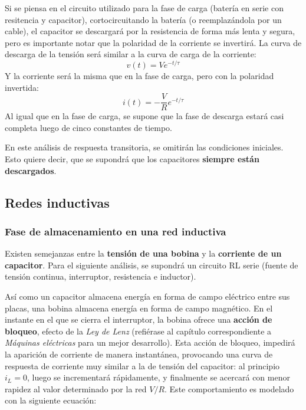 Si se piensa en el circuito utilizado para la fase de carga (batería en serie con resitencia y capacitor), cortocircuitando la batería (o reemplazándola por un cable), el capacitor se descargará por la resistencia de forma más lenta y segura, pero es importante notar que la polaridad de la corriente se invertirá. La curva de descarga de la tensión será similar a la curva de carga de la corriente:
\begin{equation}
	\label{eq:descarga_capacitor_v}
	v(t)=Ve^{-t / \tau}
\end{equation}
Y la corriente será la misma que en la fase de carga, pero con la polaridad invertida:
\begin{equation}
	\label{eq:descarga_capacitor_i}
	i(t)=-\frac{V}{R}e^{-t / \tau}
\end{equation}
Al igual que en la fase de carga, se supone que la fase de descarga estará casi completa luego de cinco constantes de tiempo.

En este análisis de respuesta transitoria, se omitirán las condiciones iniciales. Esto quiere decir, que se supondrá que los capacitores \textbf{siempre están descargados}.

\subsection{Redes inductivas}

\subsubsection{Fase de almacenamiento en una red inductiva}

Existen semejanzas entre la \textbf{tensión de una bobina} y la \textbf{corriente de un capacitor}. Para el siguiente análisis, se supondrá un circuito RL serie (fuente de tensión continua, interruptor, resistencia e inductor).

Así como un capacitor almacena energía en forma de campo eléctrico entre sus placas, una bobina almacena energía en forma de campo magnético. En el instante en el que se cierra el interruptor, la bobina ofrece una \textbf{acción de bloqueo}, efecto de la \textit{Ley de Lenz} (refiérase al capítulo correspondiente a \textit{Máquinas eléctricas} para un mejor desarrollo). Esta acción de bloqueo, impedirá la aparición de corriente de manera instantánea, provocando una curva de respuesta de corriente muy similar a la de tensión del capacitor: al principio $i_L = 0$, luego se incrementará rápidamente, y finalmente se acercará con menor rapidez al valor determinado por la red $V/R$. Este comportamiento es modelado con la siguiente ecuación:


